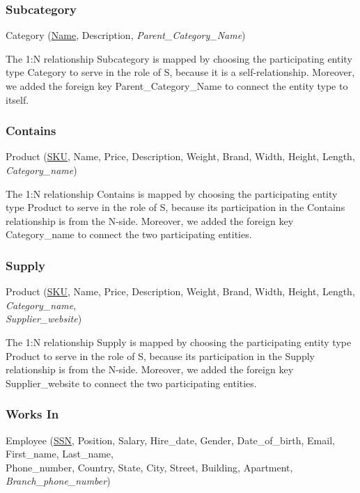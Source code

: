 \subsubsection{Subcategory}

Category (\underline{Name}, Description, \textit{Parent\_Category\_Name})

The 1:N relationship Subcategory is mapped by choosing the participating entity type Category to serve in the role of S, because it is a self-relationship. Moreover, we added the foreign key Parent\_Category\_Name to connect the entity type to itself.

\subsubsection{Contains}

Product (\underline{SKU}, Name, Price, Description, Weight, Brand, Width, Height, Length, \textit{Category\_name})

The 1:N relationship Contains is mapped by choosing the participating entity type Product to serve in the role of S, because its participation in the Contains relationship is from the N-side. Moreover, we added the foreign key Category\_name to connect the two participating entities.

\subsubsection{Supply}

Product (\underline{SKU}, Name, Price, Description, Weight, Brand, Width, Height, Length, \textit{Category\_name}, \\
\textit{Supplier\_website})

The 1:N relationship Supply is mapped by choosing the participating entity type Product to serve in the role of S, because its participation in the Supply relationship is from the N-side. Moreover, we added the foreign key Supplier\_website to connect the two participating entities.

\subsubsection{Works In}

Employee (\underline{SSN}, Position, Salary, Hire\_date, Gender, Date\_of\_birth, Email, First\_name, Last\_name,\\
Phone\_number, Country, State, City, Street, Building, Apartment, \textit{Branch\_phone\_number})

